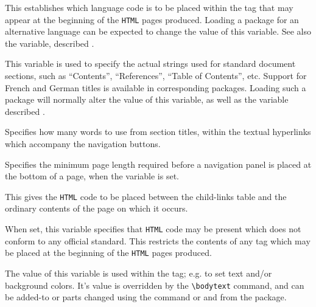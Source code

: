 \begin{htmllist}%
%
\item [\fn{\$default\_language}\texttt{ = 'english';}\label{isolanguage}]
This establishes which language code is to be placed within
the  tag that may appear at the beginning
of the \texttt{HTML} pages produced. Loading a package for
an alternative language can be expected to change the value of this variable.\html{\\}
See also the  variable, described .


\item [\fn{\$TITLES\_LANGUAGE}\texttt{ = 'english';}\label{doclanguage}]
This variable is used to specify the actual strings used for standard document
sections, such as ``Contents'', ``References'', ``Table of Contents'', etc.\html{\\}
Support for French and German titles is available in corresponding packages.
Loading such a package will normally alter the value of this variable, as well as 
the  variable described .


\item [\fn{\$WORDS\_IN\_NAVIGATION\_PANEL\_TITLES}\texttt{ = 4;}]
Specifies how many words to use from section titles,
within the textual hyperlinks which accompany the navigation buttons.


\item [\fn{\$WORDS\_IN\_PAGE}\texttt{ = 450;}]
Specifies the minimum page length required before a navigation panel
is placed at the bottom of a page,
when the  variable is set.


\item [\fn{\$CHILDLINE}\texttt{ = \char34<BR><HR>\char92n\char34;}]
This gives the \texttt{HTML} code to be placed between the child-links
table and the ordinary contents of the page on which it occurs.


\item [\fn{\$NETSCAPE\_HTML}\texttt{ = 0;}]
When set, this variable specifies that \texttt{HTML} code may be present which
does not conform to any official standard. 
This restricts the contents of any  tag which may be placed
at the beginning of the \texttt{HTML} pages produced.


\item [\fn{\$BODYTEXT}\texttt{ = '';}]
The value of this variable is used within the  tag;
e.g. to set text and/or background colors.\html{\\}
It's value is overridden by the \verb|\bodytext| command, 
and can be added-to or parts changed using the  command
or  and  from the  package.



\end{htmllist}
